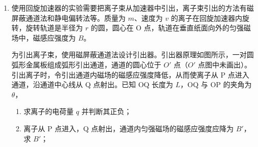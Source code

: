 \documentclass[\gkver]{gaokaozhenti}
\begin{document}
\begin{enumerate}
\begin{enumerate}
	\item
	进一步探究电磁感应现象，另选 $N_{2}=100$ 匝、形状相同的线圈，总电阻 $R=10\UO$，不接外电流，两臂平衡，如图 2 所示，保持 $B_{0}$ 不变，在线圈上部另加垂直纸面向外的匀强磁场，且磁感应强度 $B$ 随时间均匀变大，磁场区域宽度 $d=0.1\Um$。当挂盘中放质量为 $0.01\Ukg$ 的物体时，天平平衡，求此时磁感应强度的变化率 $\frac{\Delta B}{\Delta t}$。
\end{enumerate}

{figs/24b.png}


\item
使用回旋加速器的实验需要把离子束从加速器中引出，离子束引出的方法有磁屏蔽通道法和静电偏转法等。质量为 $m$、速度为 $v$ 的离子在回旋加速器内旋转，旋转轨道是半径为 $r$ 的圆，圆心在 O 点，轨道在垂直纸面向外的匀强磁场中，磁感应强度为 $B$。

为引出离子束，使用磁屏蔽通道法设计引出器。引出器原理如图所示，一对圆弧形金属板组成弧形引出通道，通道的圆心位于 $O'$ 点（$O'$ 点图中未画出）。引出离子时，令引出通道内磁场的磁感应强度降低，从而使离子从 P 点进入通道，沿通道中心线从 Q 点射出。已知 OQ 长度为 $L$，OQ 与 OP 的夹角为 $\theta$，

\begin{enumerate}
	\item
	求离子的电荷量 $q$ 并判断其正负；

	\item
	离子从 P 点进入，Q 点射出，通道内匀强磁场的磁感应强度应降为 $B'$，求 $B'$；


\end{enumerate}
\end{enumerate}
\end{document}

